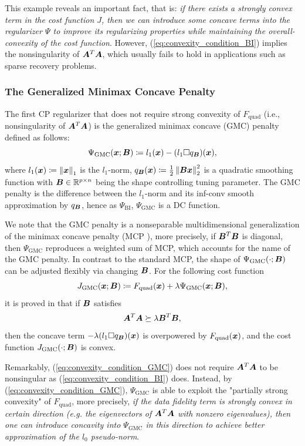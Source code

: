\documentclass[lettersize,journal]{IEEEtran}
\theoremstyle{plain}%
\theoremstyle{definition}
\theoremstyle{remark}
\begin{document}
This example reveals an important fact, that is: \textit{if there exists a strongly convex term in the cost function $J$, then we can introduce some concave terms into the regularizer $\Psi$ to improve its regularizing properties while maintaining the overall-convexity of the cost function}. However, (\ref{eq:convexity_condition_BI}) implies the nonsingularity of $\bm{A}^T\bm{A}$, which usually fails to hold in applications such as sparse recovery problems.



\subsubsection{The Generalized Minimax Concave Penalty}
\label{sec:GMC}
The first CP regularizer that does not require strong convexity of $F_{\mathrm{quad}}$ (i.e., nonsingularity of $\bm{A}^T\bm{A}$) is the generalized minimax concave (GMC) penalty \cite{selesnick2017} defined as follows:
\begin{equation}
\Psi_{\text{GMC}}(\bm{x};\bm{B})\coloneqq l_1(\bm{x})-(l_1\Box q_{\bm{B}})(\bm{x}),
\end{equation}
where $l_1(\bm{x})\coloneqq \left\| \bm{x} \right\|_1$ is the $l_1$-norm, $q_{\bm{B}}(\bm{x})\coloneqq \frac{1}{2}\left\| \bm{B}\bm{x} \right\|^2_2$ is a quadratic smoothing function with $\bm{B}\in\mathbb{R}^{p\times n}$ being the shape controlling tuning parameter. The GMC penalty is the difference between the $l_1$-norm and its inf-conv smooth approximation by $q_{\bm{B}}$, hence as $\Psi_{\mathrm{BI}}$, $\Psi_{\mathrm{GMC}}$ is a DC function. 

We note that the GMC penalty is a nonseparable multidimensional generalization of the minimax concave penalty (MCP \cite{zhang2010}), more precisely, if $\bm{B}^T\bm{B}$ is diagonal, then $\Psi_{\mathrm{GMC}}$ reproduces a weighted sum of MCP, which accounts for the name of the GMC penalty. In contrast to the standard MCP, the shape of $\Psi_{\text{GMC}}(\cdot;\bm{B})$ can be adjusted flexibly via changing $\bm{B}$. For the following cost function
\[J_{\mathrm{GMC}}(\bm{x};\bm{B})\coloneqq F_{\mathrm{quad}}(\bm{x})+\lambda\Psi_{\mathrm{GMC}}(\bm{x};\bm{B}),\]
it is proved in \cite{selesnick2017} that if $\bm{B}$ satisfies
\begin{equation}\label{eq:convexity_condition_GMC}
\bm{A}^T \bm{A}\succeq \lambda \bm{B}^T \bm{B},
\end{equation}
then the concave term $-\lambda(l_1\Box q_{\bm{B}})(\bm{x})$ is overpowered by $F_{\mathrm{quad}}(\bm{x})$, and the cost function $J_{\mathrm{GMC}}(\cdot;\bm{B})$ is convex. 

Remarkably, (\ref{eq:convexity_condition_GMC}) does not require $\bm{A}^T\bm{A}$ to be nonsingular as (\ref{eq:convexity_condition_BI}) does. Instead, by (\ref{eq:convexity_condition_GMC}), $\Psi_{\mathrm{GMC}}$ is able to exploit the "partially strong convexity" of $F_{\mathrm{quad}}$, more precisely, \textit{if the data fidelity term is strongly convex in certain direction (e.g. the eigenvectors of $\bm{A}^T\bm{A}$ with nonzero eigenvalues), then one can introduce concavity into $\Psi_{\mathrm{GMC}}$ in this direction to achieve better approximation of the $l_0$ pseudo-norm}.
\end{document}
